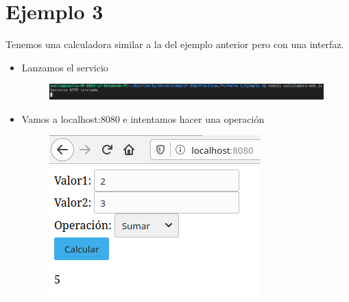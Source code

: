 \documentclass{article}
\begin{document}
	\section{Ejemplo 3}
	Tenemos una calculadora similar a la del ejemplo anterior pero con una interfaz.
	\begin{itemize}
		\item Lanzamos el servicio
		\begin{figure}[H]
			\centering
			\includegraphics[totalheight=0.7cm]{img/5.png}
		\end{figure}
		\item Vamos a localhost:8080 e intentamos hacer una operación
		\begin{figure}[H]
			\centering
			\includegraphics[totalheight=3cm]{img/6.png}
		\end{figure}
	\end{itemize}
\end{document}
